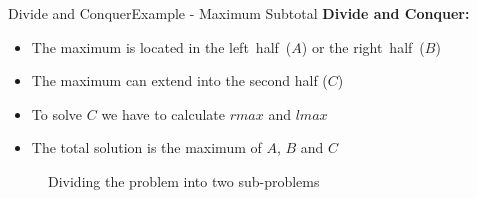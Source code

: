 \begin{frame}{Divide and Conquer}{Example - Maximum Subtotal}
  \textbf{Divide and Conquer:}
  \begin{itemize}
    \item
      The maximum is located in the {\color{Mittel-Blau}left~half~($A$)}
      or the {\color{Mittel-Blau}right~half~($B$)}
    \item
      The maximum can {\color{Mittel-Blau}extend into the second half ($C$)}
    \item
      To solve $C$ we have to calculate $rmax$ and $lmax$
    \item
      The total solution is the {\color{Mittel-Blau}maximum of $A$, $B$ and $C$}
  \end{itemize}
  \begin{figure}
    \begin{adjustbox}{width=\linewidth}
      
    \end{adjustbox}
    \caption{Dividing the problem into two sub-problems}
    \label{fig:divide_and_conquer:max_sub_total_divide2}
  \end{figure}
\end{frame}



